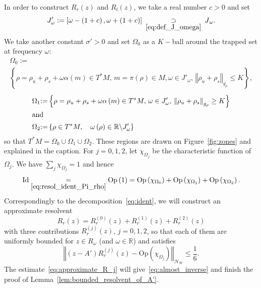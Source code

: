\documentclass[10pt]{amsart}
\theoremstyle{definition}\newtheorem{defi}[theo]{Definition}\newtheorem{rema}[theo]{Remark}\newtheorem{exam}[theo]{Example}\newtheorem{exem}[theo]{Example}\newtheorem{nota}[theo]{Notation}
\newcommand{\clH}{\mathcal{H}}
\newcommand{\Opp}{\mathrm{Op}}
\newcommand{\Id}{\mathrm{Id}}
\newcommand{\bbR}{\mathbb{R}}
\begin{document}
In order to construct $R_{r}(z)$ and $R_{l}(z)$, we take a real number $c>0$ and set
\begin{equation}\label{eq:def_J'}
J'_{\omega}:=\left[\omega-\left(1+c\right),\omega+\left(1+c\right)\right]\:\underset{\eqref{eq:def_J_omega}}{\supset}\:J{}_{\omega}.
\end{equation}
We take another constant $\sigma'>0$ and set $\Omega_{0}$ as a $K-$ball around the trapped set at frequency $\omega$:
\begin{multline}\label{eq:def_Omega_0}
\Omega_{0}:=\\
\left\{ \rho=\rho_{u}+\rho_{s}+\omega\alpha\left(m\right)\in T^{*}M,\,m=\pi\left(\rho\right)\in M,\omega\in J'_{\omega},\,\left\Vert \rho_{u}+\rho_{s}\right\Vert _{g_{\rho}}\leq K\right\},
\end{multline}
\begin{align}
\Omega_{1} &{:=}\left\{ \rho=\rho_{u}+\rho_{s}+\omega\alpha\left(m\right)\in T^{*}M,\,\omega\in J'_{\omega},\,\left\Vert \rho_{u}+\rho_{s}\right\Vert _{g_{\rho}}\geq K\right\}\label{eq:def_Omega_1}
\\
\intertext{and}
\Omega_{2} &{:=}\left\{ \rho\in T^{*}M,\quad\omega\left(\rho\right)\in\bbR\backslash J'_{\omega}\right\}\label{eq:def_Omega_2}
\end{align}
so that $T^{*}M=\Omega_{0}\cup\Omega_{1}\cup\Omega_{2}$. These regions are drawn on Figure~\ref{fig:zones} and explained in the caption. For $j=0,1,2$, let $\chi_{\Omega_{j}}$ be the characteristic function of $\Omega_{j}$. We have $\sum_{j}\chi_{\Omega_{j}}=1$ and hence
\begin{equation}\label{eq:ident}
\Id \underset{\eqref{eq:resol_ident_Pi_rho}}{=}\Opp \left(1\right)=\Opp \left(\chi_{\Omega_{0}}\right)+\Opp \left(\chi_{\Omega_{1}}\right)+\Opp \left(\chi_{\Omega_{2}}\right).
\end{equation}
Correspondingly to the decomposition~\eqref{eq:ident}, we will construct an approximate resolvent
\[
R_{r}\left(z\right)=R_{r}^{\left(0\right)}\left(z\right)+R_{r}^{\left(1\right)}\left(z\right)+R_{r}^{\left(2\right)}\left(z\right)
\]
with three contributions $R_{r}^{(j)}(z)$, $j=0,1,2$, so that each of them are uniformly bounded for $z\in R_{\omega}$ (and $\omega\in\bbR$) and satisfies
\begin{equation}\label{eq:approximate_R_j}
\left\Vert \left(z-A'\right)R_{r}^{\left(j\right)}\left(z\right)-\Opp \left(\chi_{\Omega_{j}}\right)\right\Vert _{\clH _{W}}\leq\frac{1}{6}.
\end{equation}
The estimate~\eqref{eq:approximate_R_j} will give~\eqref{eq:almost_inverse} and finish the proof of Lemma~\ref{lem:bounded_resolvent_of_A'}.
\end{document}
